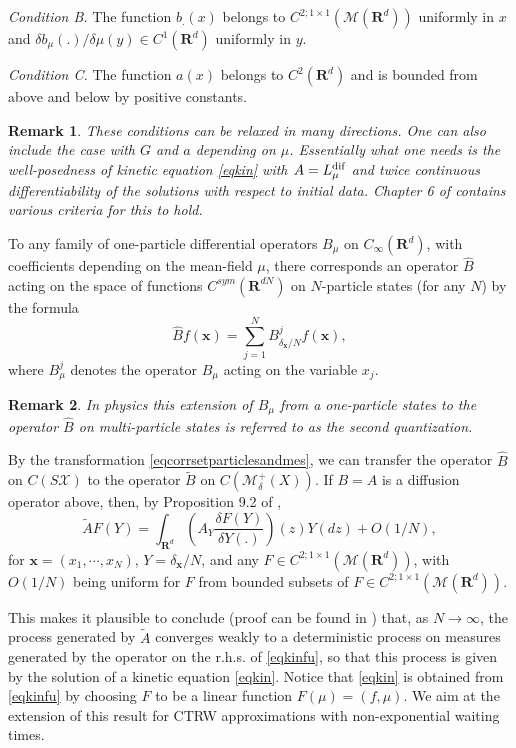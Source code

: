\documentclass[12pt]{article}
\def\MC{\mathcal{M}}
\def\XC{\mathcal{X}}
\def\R{\mathbf{R}}
\def\x{\mathbf{x}}
\def\de{\delta}
\numberwithin{equation}{section}
\newtheorem{remark}{Remark}
\begin{document}
{\it Condition B.} The function $b_{.}(x)$ belongs to $C^{2;1\times 1}(\MC(\R^d))$ uniformly in $x$ and \linebreak
$\de b_{\mu}(.)/\de \mu(y)\in C^1(\R^d)$ uniformly in $y$.

{\it Condition C.} The function $a(x)$ belongs to $C^2(\R^d)$
and is bounded from above and below by positive constants.

\begin{remark} These conditions can be relaxed in many directions.
One can also include the case with $G$ and $a$ depending on $\mu$. Essentially what one needs is the well-posedness
of kinetic equation \eqref{eqkin} with $A=L^{\rm dif}_{\mu}$ and twice continuous differentiability of the solutions
with respect to initial data. Chapter 6 of \cite{Kobook19} contains various criteria for this to hold.
\end{remark}

To any family of one-particle differential operators $B_{\mu}$ on $C_{\infty}(\R^d)$, with coefficients depending on the mean-field $\mu$, there corresponds an operator $\hat B$ acting on the space of functions $C^{sym}(\R^{dN})$ on $N$-particle states (for any $N$) by the formula
\begin{equation}
\label{secquant}
\hat B f(\x) =\sum_{j=1}^N B^j_{\de_{\x}/N}f(\x),
\end{equation}
where $B^j_{\mu}$ denotes the operator $B_{\mu}$ acting on the variable $x_j$.

\begin{remark}
In physics this extension of $B_{\mu}$ from a one-particle states to the operator $\hat B$
on multi-particle states is referred to as the second quantization.
\end{remark}

By the transformation  \eqref{eqcorrsetparticlesandmes}, we can transfer the
operator $\hat B$ on $C(S\XC)$ to the operator $\tilde B$
on $C(\MC^+_{\de}(X))$. If $B=A$ is a diffusion operator above, then, by Proposition 9.2 of \cite{Ko10},
\begin{equation}
\label{mainapp}
\tilde A F(Y) =\int_{\R^d} \left(A_Y \frac{\de F(Y)}{\de Y(.)}\right)(z)Y(dz)+O(1/N),
\end{equation}
for $\x=(x_1, \cdots, x_N)$, $Y=\de_{\x}/N$, and any $F\in C^{2;1\times 1}(\MC(\R^d))$,
with $O(1/N)$ being uniform for $F$ from bounded subsets of $F\in C^{2;1\times 1}(\MC(\R^d))$.


This makes it plausible to conclude (proof can be found in \cite{Ko10}) that, as $N\to \infty$,
the process generated by $\tilde A$ converges weakly to a deterministic process on measures
generated by the operator on the r.h.s. of \eqref{eqkinfu}, so that this process is
given by the solution of a kinetic equation \eqref{eqkin}.
Notice that \eqref{eqkin} is obtained from \eqref{eqkinfu} by choosing
$F$ to be a linear function $F(\mu)=(f,\mu)$. We aim at the extension of this result
for CTRW approximations with non-exponential waiting times.
\end{document}
